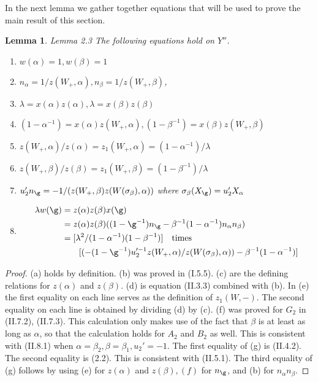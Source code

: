 \documentclass{memo-l}
\newtheorem{lemma}[theorem]{Lemma}
\theoremstyle{definition}
\theoremstyle{remark}
\numberwithin{section}{chapter}
\numberwithin{equation}{chapter}
\begin{document}
{\medskip}

In the next lemma we gather together equations that will be used to prove 
the main result of this section.

\begin{lemma}{Lemma 2.3}   The following equations hold on $Y''$.
\begin{enumerate}[label=(\alph*)]
\item $w({\alpha}) = 1, w({\beta}) = 1$
\item $n_{\alpha} = 1/z(W_{+},{\alpha}), n_{\beta} = 
1/z(W_{+},{\beta})$,
\item ${\lambda} = x({\alpha})z({\alpha}), {\lambda} = 
x({\beta})z({\beta})$
\item $(1-{\alpha}^{-1}) = x({\alpha})z(W_{+},{\alpha}), 
(1-{\beta}^{-1}) = x({\beta})z(W_{+},{\beta})$
\item $z(W_{+},{\alpha})/z({\alpha}) = z_{1}(W_{+},{\alpha}) = 
(1-{\alpha}^{-1})/{\lambda}$
\item[] $z(W_{+},{\beta})/z({\beta}) = z_{1}(W_{+},{\beta}) = 
(1-{\beta}^{-1})/{\lambda}$
\item $u_{2}'n_{{\g}} = -1/(z(W_{+},{\beta})z(W({\sigma}_{\beta}), 
{\alpha}))$ where ${\sigma}_{\beta}(X_{{\g}}) = u_{2}'X_{\alpha}$
\item $$\aligned
{\lambda}w({\g}) &= z({\alpha})z({\beta})x({\g}) \\
&= 
z({\alpha})z({\beta})((1-{\g}^{-1})n_{{\g}} - {\beta}^{-1}
(1-{\alpha}^{-1})n_{\alpha}n_{\beta})  
\\ &=
[{\lambda}^{2}/(1-{\alpha}^{-1})(1-{\beta}^{-1})] \quad
\hbox{times}\\
&\quad\quad [(-(1-{\g}^{-1})
u_{2}^{\prime-1}z(W_+,{\alpha})/z(W({\sigma}_{\beta}),{\alpha})) - 
{\beta}^{-1}(1-{\alpha}^{-1})]\endaligned$$
\end{enumerate}
\end{lemma} 

\medpagebreak

\begin{proof}    (a) holds by definition.  (b) was proved in (I.5.5). 
(c) are the defining relations for $z({\alpha})$ and $z({\beta})$. 
(d) is equation (II.3.3) combined with (b). 
In (e) the first equality on each line serves as the definition of 
$z_{1}(W,-)$. 
 The second equality on each line is obtained by dividing (d) by (c). 
(f) was proved for $G_{2}$ in (II.7.2), (II.7.3). 
 This calculation only makes use of the fact that ${\beta}$ is at least as 
long as ${\alpha}$,
so that the calculation holds for $A_{2}$ and $B_{2}$ as well. 
 This is consistent with (II.8.1) when ${\alpha} = {\beta}_{2}, 
{\beta}={\beta}_{1}, u_{2}'=-1$. 
 The first equality of (g) is (II.4.2). 
 The second equality is (2.2). 
 This is consistent with (II.5.1). 
 The third equality of (g) follows by using (e) for $z({\alpha})$ and 
$z({\beta}), (f)$ for $n_{{\g}}$, and (b) for $n_{\alpha}n_{\beta}$.
\end{proof}
\end{document}

